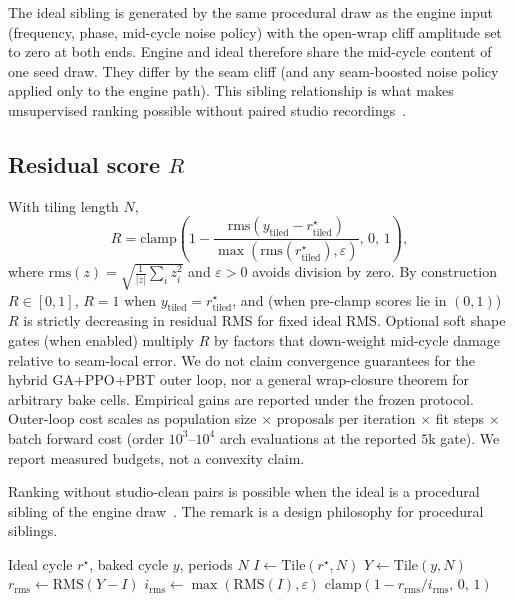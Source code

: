 The ideal sibling is generated by the same procedural draw as the engine input (frequency, phase, mid-cycle noise policy) with the open-wrap cliff amplitude set to zero at both ends.
Engine and ideal therefore share the mid-cycle content of one seed draw.
They differ by the seam cliff (and any seam-boosted noise policy applied only to the engine path).
This sibling relationship is what makes unsupervised ranking possible without paired studio recordings~\cite{lehtinen2018,kashyap2021n2n}.

\subsection{Residual score $R$}
\label{sec:residual-score}

With tiling length $N$,
\begin{equation}
\label{eq:R}
R=\mathrm{clamp}\!\left(1-\frac{\mathrm{rms}(y_{\mathrm{tiled}}-r^{\star}_{\mathrm{tiled}})}{\max(\mathrm{rms}(r^{\star}_{\mathrm{tiled}}),\varepsilon)},\,0,\,1\right),
\end{equation}
where $\mathrm{rms}(z)=\sqrt{\frac{1}{|z|}\sum_i z_i^2}$ and $\varepsilon>0$ avoids division by zero.
By construction $R\in[0,1]$, $R{=}1$ when $y_{\mathrm{tiled}}=r^{\star}_{\mathrm{tiled}}$, and (when pre-clamp scores lie in $(0,1)$) $R$ is strictly decreasing in residual RMS for fixed ideal RMS.
Optional soft shape gates (when enabled) multiply $R$ by factors that down-weight mid-cycle damage relative to seam-local error.
We do not claim convergence guarantees for the hybrid GA{+}PPO{+}PBT outer loop, nor a general wrap-closure theorem for arbitrary bake cells.
Empirical gains are reported under the frozen protocol.
Outer-loop cost scales as population size $\times$ proposals per iteration $\times$ fit steps $\times$ batch forward cost (order $10^{3}$--$10^{4}$ arch evaluations at the reported $5$k gate). We report measured budgets, not a convexity claim.

\begin{remark}
\label{rem:n2n}
Ranking without studio-clean pairs is possible when the ideal is a procedural sibling of the engine draw~\cite{lehtinen2018,kashyap2021n2n}.
The remark is a design philosophy for procedural siblings.
\end{remark}

\begin{algorithm}[t]
\caption{ResidualScore}
\label{alg:residual}
\begin{algorithmic}[1]
\Require Ideal cycle $r^{\star}$, baked cycle $y$, periods $N$
\State $I \gets \mathrm{Tile}(r^{\star}, N)$
\State $Y \gets \mathrm{Tile}(y, N)$
\State $r_{\mathrm{rms}} \gets \mathrm{RMS}(Y-I)$
\State $i_{\mathrm{rms}} \gets \max(\mathrm{RMS}(I), \varepsilon)$
\State \Return $\mathrm{clamp}(1 - r_{\mathrm{rms}}/i_{\mathrm{rms}},\,0,\,1)$
\end{algorithmic}
\end{algorithm}

